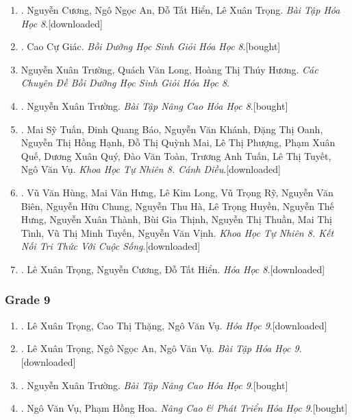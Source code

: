 \documentclass{article}
\begin{document}
\begin{enumerate}
	\item \cite{SBT_Hoa_Hoc_8}. Nguyễn Cương, Ngô Ngọc An, Đỗ Tất Hiển, Lê Xuân Trọng. \textit{Bài Tập Hóa Học 8}.\hfill\textsf{[downloaded]}
	\item \cite{Giac2021}. Cao Cự Giác. \textit{Bồi Dưỡng Học Sinh Giỏi Hóa Học 8}.\hfill\textsf{[bought]}
	\item Nguyễn Xuân Trường, Quách Văn Long, Hoàng Thị Thúy Hương. \textit{Các Chuyên Đề Bồi Dưỡng Học Sinh Giỏi Hóa Học 8}.
	\item \cite{Truong_BTNC_Hoa_Hoc_8_2022}. Nguyễn Xuân Trường. \textit{Bài Tập Nâng Cao Hóa Học 8}.\hfill\textsf{[bought]}
	\item \cite{SGK_KHTN_8_Canh_Dieu}. Mai Sỹ Tuấn, Đinh Quang Báo, Nguyễn Văn Khánh, Đặng Thị Oanh, Nguyễn Thị Hồng Hạnh, Đỗ Thị Quỳnh Mai, Lê Thị Phượng, Phạm Xuân Quế, Dương Xuân Quý, Đào Văn Toàn, Trương Anh Tuấn, Lê Thị Tuyết, Ngô Văn Vụ. \textit{Khoa Học Tự Nhiên 8. Cánh Diều}.\hfill\textsf{[downloaded]}
	\item \cite{SGK_KHTN_8_KNTTVCS}. Vũ Văn Hùng, Mai Văn Hưng, Lê Kim Long, Vũ Trọng Rỹ, Nguyễn Văn Biên, Nguyễn Hữu Chung, Nguyễn Thu Hà, Lê Trọng Huyền, Nguyễn Thế Hưng, Nguyễn Xuân Thành, Bùi Gia Thịnh, Nguyễn Thị Thuần, Mai Thị Tình, Vũ Thị Minh Tuyến, Nguyễn Văn Vịnh. \textit{Khoa Học Tự Nhiên 8. Kết Nối Tri Thức Với Cuộc Sống}.\hfill\textsf{[downloaded]}
	\item \cite{SGK_Hoa_Hoc_8}. Lê Xuân Trọng, Nguyễn Cương, Đỗ Tất Hiển. \textit{Hóa Học 8}.\hfill\textsf{[downloaded]}
\end{enumerate}

\subsubsection{Grade 9}

\begin{enumerate}	
	\item \cite{SGK_Hoa_Hoc_9}. Lê Xuân Trọng, Cao Thị Thặng, Ngô Văn Vụ. \textit{Hóa Học 9}.\hfill\textsf{[downloaded]}
	\item \cite{SBT_Hoa_Hoc_9}. Lê Xuân Trọng, Ngô Ngọc An, Ngô Văn Vụ. \textit{Bài Tập Hóa Học 9}.\hfill\textsf{[downloaded]}
	\item \cite{Truong_BTNC_Hoa_Hoc_9_2021}. Nguyễn Xuân Trường. \textit{Bài Tập Nâng Cao Hóa Học 9}.\hfill\textsf{[bought]}
	\item \cite{Vu_Hoa2021}. Ngô Văn Vụ, Phạm Hồng Hoa. \textit{Nâng Cao \& Phát Triển Hóa Học 9}.\hfill\textsf{[bought]}
\end{enumerate}
\end{document}
